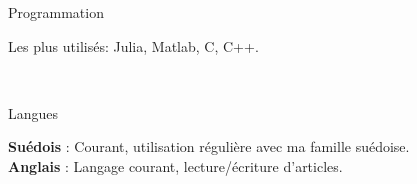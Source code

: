 \documentclass[a4paper,10pt, french]{article}
\begin{document}
%

\noindent
\begin{minipage}{0.20\textwidth}
	\color{MyGray} Programmation
\end{minipage}
\hfill
\begin{minipage}{0.70\textwidth}
	Les plus utilisés: Julia, Matlab, C, C++.\\
\end{minipage}\\
\vspace{2mm}

\noindent
\begin{minipage}{0.20\textwidth}
  \color{MyGray} Langues
\end{minipage}
\hfill
\begin{minipage}{0.70\textwidth}
  \textbf{Suédois} : Courant, utilisation régulière avec ma famille suédoise.\\
  \textbf{Anglais} : Langage courant, lecture/écriture d'articles.\\
\end{minipage}\\
\vspace{2mm}
\end{document}
